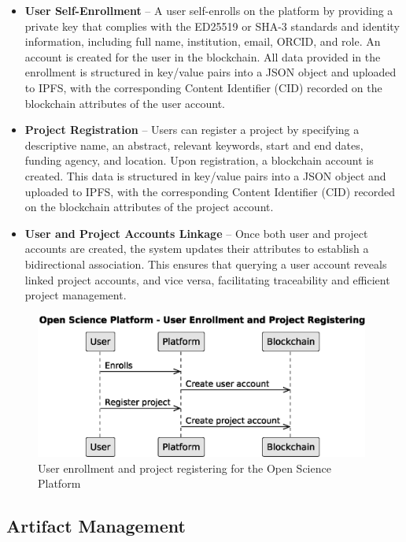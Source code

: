 \documentclass{article}
\begin{document}
\begin{itemize}
      \item \textbf{User Self-Enrollment} – A user self-enrolls on the platform by providing a private key that complies with the ED25519 or SHA-3 standards and identity information, including full name, institution, email, ORCID, and role. An account is created for the user in the blockchain. All data provided in the enrollment is structured in key/value pairs into a JSON object and uploaded to IPFS, with the corresponding Content Identifier (CID) recorded on the blockchain attributes of the user account.

      \item \textbf{Project Registration} – Users can register a project by specifying a descriptive name, an abstract, relevant keywords, start and end dates, funding agency, and location. Upon registration, a blockchain account is created. This data is structured in key/value pairs into a JSON object and uploaded to IPFS, with the corresponding Content Identifier (CID) recorded on the blockchain attributes of the project account.


      \item \textbf{User and Project Accounts Linkage} – Once both user and project accounts are created, the system updates their attributes to establish a bidirectional association. This ensures that querying a user account reveals linked project accounts, and vice versa, facilitating traceability and efficient project management.
\end{itemize}


\begin{figure}[htbp]
      \centering
      \includegraphics[width=0.98\textwidth, keepaspectratio]{c4_platform_operations_1}
      \caption{User enrollment and project registering for the Open Science Platform}
      \label{fig:c4_operations_diagram}
\end{figure}


\subsection{Artifact Management}
\end{document}

